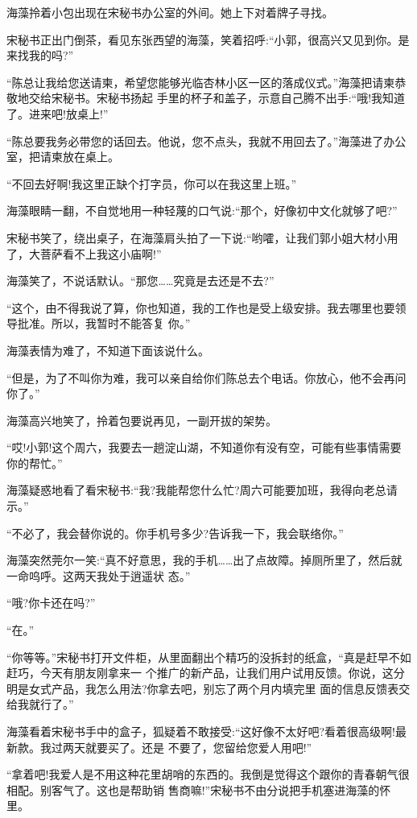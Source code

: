 \documentclass[11pt,a4paper,onecolumn]{article}
\begin{document}
海藻拎着小包出现在宋秘书办公室的外间。她上下对着牌子寻找。

宋秘书正出门倒茶，看见东张西望的海藻，笑着招呼:``小郭，很高兴又见到你。是来找我的吗?''

``陈总让我给您送请柬，希望您能够光临杏林小区一区的落成仪式。''海藻把请柬恭敬地交给宋秘书。宋秘书扬起
手里的杯子和盖子，示意自己腾不出手:``哦!我知道了。进来吧!放桌上!''

``陈总要我务必带您的话回去。他说，您不点头，我就不用回去了。''海藻进了办公室，把请柬放在桌上。

``不回去好啊!我这里正缺个打字员，你可以在我这里上班。''

海藻眼睛一翻，不自觉地用一种轻蔑的口气说:``那个，好像初中文化就够了吧?''

宋秘书笑了，绕出桌子，在海藻肩头拍了一下说:``哟嚯，让我们郭小姐大材小用了，大菩萨看不上我这小庙啊!''

海藻笑了，不说话默认。``那您……究竟是去还是不去?''

``这个，由不得我说了算，你也知道，我的工作也是受上级安排。我去哪里也要领导批准。所以，我暂时不能答复
你。''

海藻表情为难了，不知道下面该说什么。

``但是，为了不叫你为难，我可以亲自给你们陈总去个电话。你放心，他不会再问你了。''

海藻高兴地笑了，拎着包要说再见，一副开拔的架势。

``哎!小郭!这个周六，我要去一趟淀山湖，不知道你有没有空，可能有些事情需要你的帮忙。''

海藻疑惑地看了看宋秘书:``我?我能帮您什么忙?周六可能要加班，我得向老总请示。''

``不必了，我会替你说的。你手机号多少?告诉我一下，我会联络你。''

海藻突然莞尔一笑:``真不好意思，我的手机……出了点故障。掉厕所里了，然后就一命呜呼。这两天我处于逍遥状
态。''

``哦?你卡还在吗?''

``在。''

``你等等。''宋秘书打开文件柜，从里面翻出个精巧的没拆封的纸盒，``真是赶早不如赶巧，今天有朋友刚拿来一
个推广的新产品，让我们用户试用反馈。你说，这分明是女式产品，我怎么用法?你拿去吧，别忘了两个月内填完里
面的信息反馈表交给我就行了。''

海藻看着宋秘书手中的盒子，狐疑着不敢接受:``这好像不太好吧?看着很高级啊!最新款。我过两天就要买了。还是
不要了，您留给您爱人用吧!''

``拿着吧!我爱人是不用这种花里胡哨的东西的。我倒是觉得这个跟你的青春朝气很相配。别客气了。这也是帮助销
售商嘛!''宋秘书不由分说把手机塞进海藻的怀里。
\end{document}
